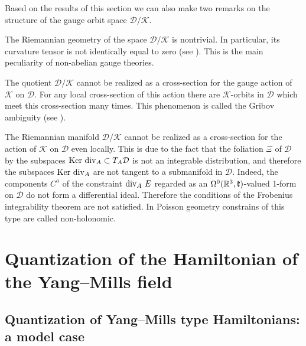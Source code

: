 \documentclass{amsart}
\begin{document}
Based on the results of this section we can also make two remarks on the
structure of the gauge orbit space $\mathcal{D}/\mathcal{K}$.
\begin{remark}
The Riemannian geometry of the space $\mathcal{D}/\mathcal{K}$ is
nontrivial. In particular, its curvature tensor is not identically equal to
zero (see \cite{Sing}). This is the main peculiarity of non-abelian gauge
theories.
\end{remark}


\begin{remark}
The quotient $\mathcal{D}/\mathcal{K}$ cannot be
realized as a cross-section for the gauge action of $\mathcal{K}$ on
$\mathcal{D}$.
For any local cross-section of this action there are $\mathcal{K}$-orbits in
$\mathcal{D}$ which
meet this cross-section many times. This phenomenon is called the Gribov
ambiguity (see \cite{Sing1}).

The Riemannian manifold $\mathcal{D}/\mathcal{K}$ cannot be
realized as a cross-section for the action of $\mathcal{K}$ on
$\mathcal{D}$ even locally.
This is due to the fact that the
foliation $\Xi$ of $\mathcal{D}$ by the subspaces ${\rm Ker~div}_A\subset T_A\mathcal{D}$
is not an integrable distribution, and therefore the
subspaces ${\rm Ker~div}_A$ are not tangent to a submanifold in
$\mathcal{D}$. Indeed, the components $C^a$ of the constraint ${\rm div}_A~E$ regarded as an
$\Omega^0(\mathbb{R}^3,\mathfrak k)$-valued 1-form on $\mathcal{D}$ do not form a
differential ideal. Therefore the conditions of the Frobenius integrability theorem are
not satisfied. In Poisson geometry constrains of this type are called
non-holonomic.
\end{remark}



\section{Quantization of the Hamiltonian of the Yang--Mills field}


\subsection{Quantization of Yang--Mills type Hamiltonians: a model case}\label{quantmod}
\end{document}
